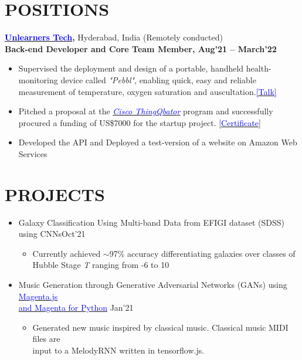 \documentclass[11pt]{res} %
\begin{document}
\begin{resume}
\section{POSITIONS}
\vspace{0.1in}
{\bf \href{https://www.linkedin.com/company/unlearners-tech/}{\textcolor{blue}{Unlearners Tech}},} Hyderabad, India (Remotely conducted)\\
\vspace{0.1in}
\textbf{Back-end Developer and Core Team Member, Aug'21 -- March'22}
\begin{itemize}
 \item {Supervised the deployment and design of a portable, handheld health-monitoring device called \emph{"Pebbl"}, enabling quick, easy and reliable measurement of temperature, oxygen saturation and auscultation.}\hfill \href{https://www.youtube.com/watch?v=BABDerk9_6Y}{\textcolor{blue}{[Talk]}}
 \item{Pitched a proposal at the \href{https://thingqbator.nasscomfoundation.org/#}{\emph{\textcolor{blue}{Cisco ThingQbator}}} program and successfully procured a funding of US\$7000 for the startup project.} \hfill [\href{https://drive.google.com/file/d/1dDWpXgUP6_PzmwOJ5yWtgR0gMLfPi-SZ/view?usp=sharing}{\textcolor{blue}{Certificate}}]
 \item {Developed the API and Deployed a test-version of a website on Amazon Web Services}
 \end{itemize}
 \vspace{0.25in}
\hline
\section{PROJECTS}
\vspace{0.25in}
\begin{itemize}
    \item Galaxy Classification Using Multi-band Data from EFIGI dataset (SDSS)\\ using CNNs\hfill Oct'21
    \begin{itemize}
        \item Currently achieved $\sim$97\% accuracy differentiating galaxies over classes of \\ Hubble Stage \textit{T} ranging from -6 to 10
    \end{itemize}
    
    \item Music Generation through Generative Adversarial Networks (GANs) using \href{https://magenta.tensorflow.org/}{\textcolor{blue}{Magenta.js \\and Magenta for Python}} \hfill Jan'21
    \begin{itemize}
        \item Generated new music inspired by classical music. Classical music MIDI files are \\ input to a MelodyRNN written in tensorflow.js.
    \end{itemize}
    

\end{itemize}
\end{resume}
\end{document}

